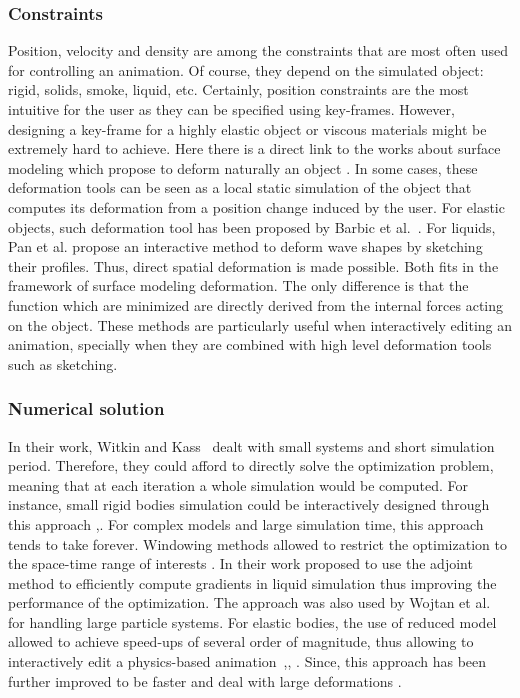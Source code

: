 \subsubsection{Constraints}
Position, velocity and density are among the constraints that are most often used for controlling an animation. 
Of course, they depend on the simulated object: rigid, solids, smoke, liquid, etc. 
Certainly, position constraints are the most intuitive for the user as they can be specified using key-frames. 
However, designing a key-frame for a highly elastic object or viscous materials might be extremely hard to achieve. 
Here there is a direct link to the works about surface modeling which propose to deform naturally an object \cite{Sorkine2007, Hildebrandt2011}. 
In some cases, these deformation tools can be seen as a local static simulation of the object that computes its deformation from a position change induced by the user. 
For elastic objects, such deformation tool has been proposed by Barbic et al.~\cite{Barbic2012}.
For liquids, Pan et al. \cite{Pan2013} propose an interactive method to deform wave shapes by sketching their profiles. 
Thus, direct spatial deformation is made possible. 
Both fits in the framework of surface modeling deformation. 
The only difference is that the function which are minimized are directly derived from the internal forces acting on the object. 
These methods are particularly useful when interactively editing an animation, specially when they are combined with high level deformation tools such as sketching.

\subsubsection{Numerical solution}
In their work, Witkin and Kass~\cite{Witkin1988} dealt with small systems and short simulation period.
Therefore, they could afford to directly solve the optimization problem, meaning that at each iteration a whole simulation would be computed. For instance, small rigid bodies simulation could be interactively designed through this approach \cite{Popovic2000},\cite{Popovic2003}. For complex models and large simulation time, this approach tends to take forever. Windowing methods allowed to restrict the optimization to the space-time range of interests \cite{Cohen1992}. In their work \cite{McNamara2004} proposed to use the adjoint method to efficiently compute gradients in liquid simulation thus improving the performance of the optimization. The approach was also used by Wojtan et al.~\cite{wojtan2006keyframe} for handling large particle systems. For elastic bodies, the use of reduced model allowed to achieve speed-ups of several order of magnitude, thus allowing to interactively edit a physics-based animation~\cite{Barbic2012},\cite{Hildebrandt2012}, \cite{Hahn2012}. Since, this approach has been further improved to be faster \cite{Schulz2014} and deal with large deformations \cite{Li2014}.

